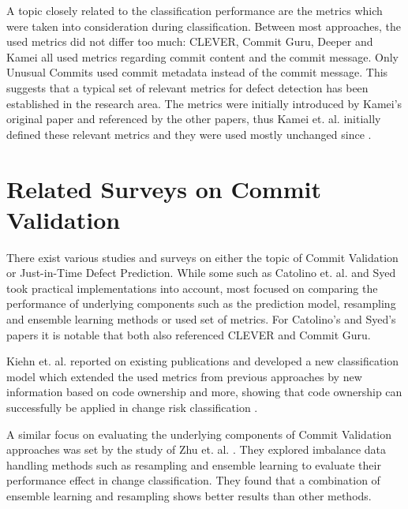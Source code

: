 A topic closely related to the classification performance are the metrics which were taken into consideration during classification. Between most approaches, the used metrics did not differ too much: CLEVER, Commit Guru, Deeper and Kamei all used metrics regarding commit content and the commit message. Only Unusual Commits used commit metadata instead of the commit message. This suggests that a typical set of relevant metrics for defect detection has been established in the research area. The metrics were initially introduced by Kamei's original paper and referenced by the other papers, thus Kamei et. al. initially defined these relevant metrics and they were used mostly unchanged since \cite{Kamei2013}.




\section{Related Surveys on Commit Validation}
\label{sec:relatedsurveys}

There exist various studies and surveys on either the topic of Commit Validation or Just-in-Time Defect Prediction. While some such as Catolino et. al. \cite{Catolino2019} and Syed \cite{Syed2019} took practical implementations into account, most focused on comparing the performance of underlying components such as the prediction model, resampling and ensemble learning methods or used set of metrics. For Catolino's and Syed's papers it is notable that both also referenced CLEVER and Commit Guru.

Kiehn et. al. reported on existing publications and developed a new classification model which extended the used metrics from previous approaches by new information based on code ownership and more, showing that code ownership can successfully be applied in change risk classification \cite{Kiehn2019}.

A similar focus on evaluating the underlying components of Commit Validation approaches was set by the study of Zhu et. al. \cite{Zhu2018}. They explored imbalance data handling methods such as resampling and ensemble learning to evaluate their performance effect in change classification. They found that a combination of ensemble learning and resampling shows better results than other methods. 

